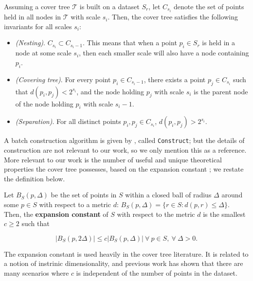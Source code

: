 Assuming a cover tree $\mathscr{T}$ is built on a dataset $S_r$, let $C_{s_i}$
denote the set of points held in all nodes in $\mathscr{T}$ with scale $s_i$.
Then, the cover tree satisfies the following invariants for all scales $s_i$:

\begin{itemize}

\item {\em (Nesting)}.  $C_{s_i} \subset C_{s_i - 1}$.  This means that when a
point $p_i \in S_r$ is held in a node at some scale $s_i$, then each smaller
scale will also have a node containing $p_i$.

\item {\em (Covering tree)}.  For every point $p_i \in C_{s_i - 1}$, there
exists a point $p_j \in C_{s_i}$ such that $d(p_i, p_j) < 2^{s_i}$, and the node
holding $p_j$ with scale $s_i$ is the parent node of the node holding $p_i$ with
scale $s_i - 1$.

\item {\em (Separation)}.  For all distinct points $p_i, p_j \in C_{s_i}$,
$d(p_i, p_j) > 2^{s_i}$.

\end{itemize}

A batch construction algorithm is given by \citet{langford2006}, called
\texttt{Construct}; but the details of construction are not relevant to our
work, so we only mention this as a reference.  More relevant to our work is the
number of useful and unique theoretical properties the cover tree possesses,
based on the expansion constant \citep{karger2002finding}; we restate the
definition below.

\begin{defn}
\label{def:int_dim}
Let $B_S(p, \Delta)$ be the set of points in $S$ within a closed ball of radius
$\Delta$ around some $p \in S$ with respect to a metric $d$:
%
$B_S(p, \Delta) = \{ r \in S \colon d(p, r) \leq \Delta \}$.
%
Then, the {\bf expansion constant} of $S$ with respect to the metric $d$ is the
smallest $c \ge 2$ such that

\begin{equation}
| B_S(p, 2 \Delta) | \le c | B_S(p, \Delta) |\ \forall\ p \in S,\
\forall\ \Delta > 0.
\end{equation}

\end{defn}

The expansion constant is used heavily in the cover tree literature.  It is
related to a notion of instrinic dimensionality, and previous work has shown
that there are many scenarios where $c$ is independent of the number of points
in the dataset.

